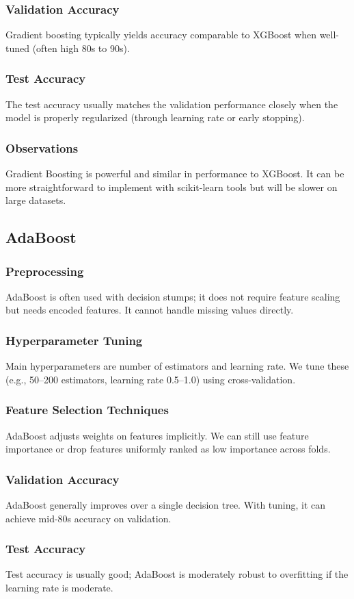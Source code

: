 \documentclass[12pt]{article}
\begin{document}
\subsubsection{Validation Accuracy}
Gradient boosting typically yields accuracy comparable to XGBoost when well-tuned (often high 80s to 90s).
\subsubsection{Test Accuracy}
The test accuracy usually matches the validation performance closely when the model is properly regularized (through learning rate or early stopping).
\subsubsection{Observations}
Gradient Boosting is powerful and similar in performance to XGBoost. It can be more straightforward to implement with scikit-learn tools but will be slower on large datasets.

\subsection{AdaBoost}
\subsubsection{Preprocessing}
AdaBoost is often used with decision stumps; it does not require feature scaling but needs encoded features. It cannot handle missing values directly.
\subsubsection{Hyperparameter Tuning}
Main hyperparameters are number of estimators and learning rate. We tune these (e.g., 50--200 estimators, learning rate 0.5--1.0) using cross-validation.
\subsubsection{Feature Selection Techniques}
AdaBoost adjusts weights on features implicitly. We can still use feature importance or drop features uniformly ranked as low importance across folds.
\subsubsection{Validation Accuracy}
AdaBoost generally improves over a single decision tree. With tuning, it can achieve mid-80s accuracy on validation.
\subsubsection{Test Accuracy}
Test accuracy is usually good; AdaBoost is moderately robust to overfitting if the learning rate is moderate.
\end{document}
